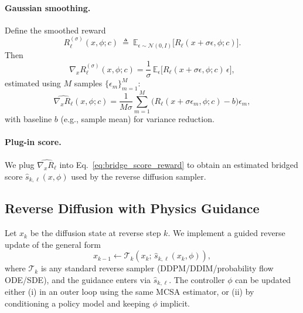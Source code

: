 \paragraph{Gaussian smoothing.}
Define the smoothed reward
\begin{equation}
R_\ell^{(\sigma)}(x,\phi;c)
~\triangleq~
\mathbb{E}_{\epsilon\sim\mathcal{N}(0,I)}\big[R_\ell(x+\sigma\epsilon,\phi;c)\big].
\label{eq:smooth_reward}
\end{equation}
Then
\begin{equation}
\nabla_x R_\ell^{(\sigma)}(x,\phi;c)
=
\frac{1}{\sigma}\,
\mathbb{E}_{\epsilon}\Big[R_\ell(x+\sigma\epsilon,\phi;c)\,\epsilon\Big],
\label{eq:es_grad_identity}
\end{equation}
estimated using $M$ samples $\{\epsilon_m\}_{m=1}^M$:
\begin{equation}
\widehat{\nabla_x R_\ell}(x,\phi;c)
=
\frac{1}{M\sigma}\sum_{m=1}^{M}
\Big(R_\ell(x+\sigma\epsilon_m,\phi;c)-b\Big)\epsilon_m,
\label{eq:es_grad_estimator}
\end{equation}
with baseline $b$ (e.g., sample mean) for variance reduction.

\paragraph{Plug-in score.}
We plug $\widehat{\nabla_x R_\ell}$ into Eq.~\eqref{eq:bridge_score_reward} to obtain
an estimated bridged score $\widehat{s}_{k,\ell}(x,\phi)$ used by the reverse diffusion sampler.

\subsection{Reverse Diffusion with Physics Guidance}
\label{subsec:reverse_diffusion}

Let $x_k$ be the diffusion state at reverse step $k$.
We implement a guided reverse update of the general form
\begin{equation}
x_{k-1} \leftarrow \mathcal{T}_k\!\left(x_k;\, \widehat{s}_{k,\ell}(x_k,\phi)\right),
\label{eq:reverse_update_generic}
\end{equation}
where $\mathcal{T}_k$ is any standard reverse sampler (DDPM/DDIM/probability flow ODE/SDE),
and the guidance enters via $\widehat{s}_{k,\ell}$.
The controller $\phi$ can be updated either
(i) in an outer loop using the same MCSA estimator, or
(ii) by conditioning a policy model and keeping $\phi$ implicit.


